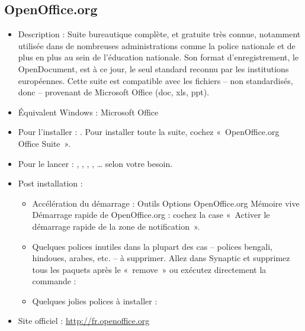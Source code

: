 \subsection{OpenOffice.org}
\label{RefInstallOOo}
\begin{itemize}
\begingroup
{}
\item Description : Suite bureautique complète,  et gratuite très connue, notamment utilisée dans de nombreuses administrations comme la police nationale et de plus en plus au sein de l'éducation nationale. Son format d'enregistrement, le OpenDocument, est à ce jour, le seul standard reconnu par les institutions européennes. Cette suite est compatible avec les fichiers -- non standardisés, donc -- provenant de Microsoft Office (doc, xls, ppt).{\par}
\endgroup
\item Équivalent Windows : Microsoft Office{\par}
\item Pour l'installer : . Pour installer toute la suite, cochez «~OpenOffice.org Office Suite~».{\par}
\item Pour le lancer : , , , , \ldots{} selon votre besoin.{\par}
\item Post installation :{\par}
\begin{itemize}
\item Accélération du démarrage : Outils \FlecheDroite Options \FlecheDroite OpenOffice.org \FlecheDroite  Mémoire vive \FlecheDroite Démarrage rapide de OpenOffice.org : cochez la case «~Activer le démarrage rapide de la zone de notification~».
\item Quelques polices inutiles dans la plupart des cas -- polices bengali, hindoues, arabes, etc. -- à supprimer. Allez dans Synaptic et supprimez tous les paquets après le «~remove~» ou exécutez directement la commande : 
\item Quelques jolies polices à installer : 
\end{itemize}
\item Site officiel : \url{http://fr.openoffice.org}{\par}
\end{itemize}
